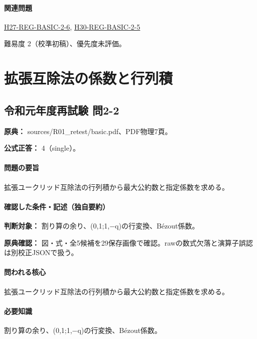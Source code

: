 \paragraph{関連問題} \hyperref[q:h27-reg-basic-2-6]{H27-REG-BASIC-2-6}, \hyperref[q:h30-reg-basic-2-5]{H30-REG-BASIC-2-5}

\par 難易度 2（校準初稿）、優先度未評価。

\section{拡張互除法の係数と行列積}

\subsection{令和元年度再試験 問2-2}
\label{q:r01-ret-basic-2-2}

\noindent\textbf{原典：} sources/R01\_retest/basic.pdf、PDF物理7頁。

\textbf{公式正答：} 4（single）。

\paragraph{問題の要旨} 拡張ユークリッド互除法の行列積から最大公約数と指定係数を求める。

\paragraph{確認した条件・記述（独自要約）}\mbox{}\par

\noindent\textbf{判断対象：} 割り算の余り、(0,1;1,−q)の行変換、Bézout係数。\par

\noindent\textbf{原典確認：} 図・式・全5候補を29保存画像で確認。rawの数式欠落と演算子誤認は別校正JSONで扱う。\par

\paragraph{問われる核心} 拡張ユークリッド互除法の行列積から最大公約数と指定係数を求める。

\paragraph{必要知識} 割り算の余り、(0,1;1,−q)の行変換、Bézout係数。

